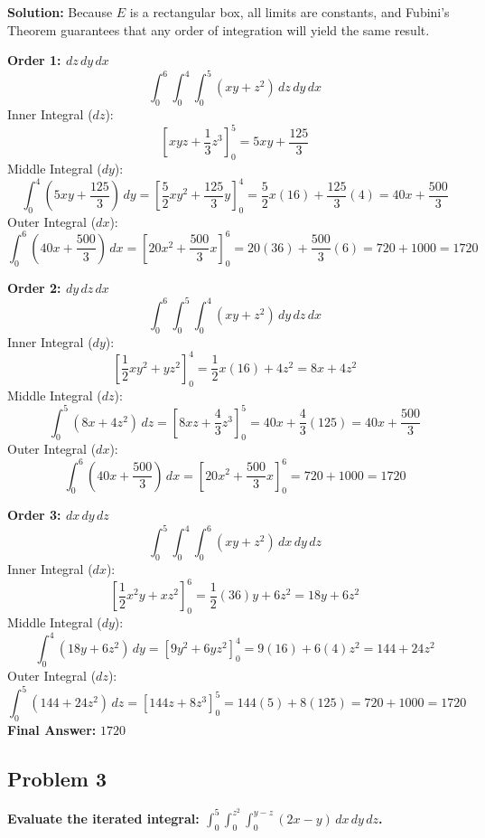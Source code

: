 \documentclass[12pt]{article}
\begin{document}
\textbf{Solution:}
Because $E$ is a rectangular box, all limits are constants, and Fubini's Theorem guarantees that any order of integration will yield the same result.

\textbf{Order 1: $dz \, dy \, dx$}
\[ \int_{0}^{6} \int_{0}^{4} \int_{0}^{5} (xy + z^2) \, dz \, dy \, dx \]
Inner Integral ($dz$):
\[ \left[ xyz + \frac{1}{3}z^3 \right]_{0}^{5} = 5xy + \frac{125}{3} \]
Middle Integral ($dy$):
\[ \int_{0}^{4} \left( 5xy + \frac{125}{3} \right) \, dy = \left[ \frac{5}{2}xy^2 + \frac{125}{3}y \right]_{0}^{4} = \frac{5}{2}x(16) + \frac{125}{3}(4) = 40x + \frac{500}{3} \]
Outer Integral ($dx$):
\[ \int_{0}^{6} \left( 40x + \frac{500}{3} \right) \, dx = \left[ 20x^2 + \frac{500}{3}x \right]_{0}^{6} = 20(36) + \frac{500}{3}(6) = 720 + 1000 = 1720 \]

\textbf{Order 2: $dy \, dz \, dx$}
\[ \int_{0}^{6} \int_{0}^{5} \int_{0}^{4} (xy + z^2) \, dy \, dz \, dx \]
Inner Integral ($dy$):
\[ \left[ \frac{1}{2}xy^2 + yz^2 \right]_{0}^{4} = \frac{1}{2}x(16) + 4z^2 = 8x + 4z^2 \]
Middle Integral ($dz$):
\[ \int_{0}^{5} (8x + 4z^2) \, dz = \left[ 8xz + \frac{4}{3}z^3 \right]_{0}^{5} = 40x + \frac{4}{3}(125) = 40x + \frac{500}{3} \]
Outer Integral ($dx$):
\[ \int_{0}^{6} \left( 40x + \frac{500}{3} \right) \, dx = \left[ 20x^2 + \frac{500}{3}x \right]_{0}^{6} = 720 + 1000 = 1720 \]

\textbf{Order 3: $dx \, dy \, dz$}
\[ \int_{0}^{5} \int_{0}^{4} \int_{0}^{6} (xy + z^2) \, dx \, dy \, dz \]
Inner Integral ($dx$):
\[ \left[ \frac{1}{2}x^2y + xz^2 \right]_{0}^{6} = \frac{1}{2}(36)y + 6z^2 = 18y + 6z^2 \]
Middle Integral ($dy$):
\[ \int_{0}^{4} (18y + 6z^2) \, dy = \left[ 9y^2 + 6yz^2 \right]_{0}^{4} = 9(16) + 6(4)z^2 = 144 + 24z^2 \]
Outer Integral ($dz$):
\[ \int_{0}^{5} (144 + 24z^2) \, dz = \left[ 144z + 8z^3 \right]_{0}^{5} = 144(5) + 8(125) = 720 + 1000 = 1720 \]
\textbf{Final Answer:} $1720$

\vspace{0.5cm}
\subsection*{Problem 3}
\textbf{Evaluate the iterated integral: $\int_{0}^{5} \int_{0}^{z^2} \int_{0}^{y-z} (2x - y) \, dx \, dy \, dz$.}
\end{document}
